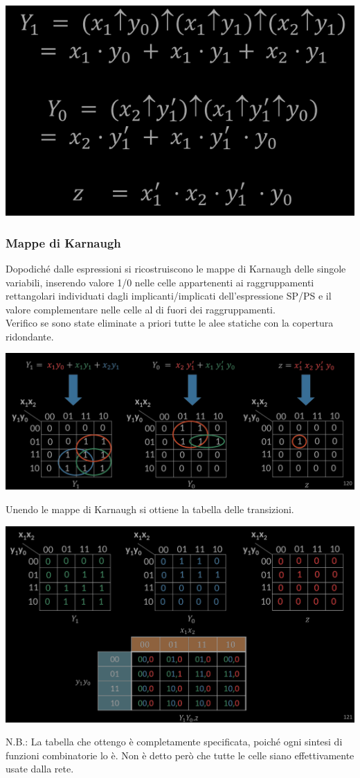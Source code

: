 \documentclass{article}
\begin{document}
\begin{center}
    \includegraphics[scale=0.4]{nand2retroEspr.png}
\end{center}
\subsubsection*{Mappe di Karnaugh}
Dopodiché dalle espressioni si ricostruiscono le mappe di Karnaugh delle singole variabili, inserendo valore 1/0 nelle celle appartenenti ai raggruppamenti rettangolari individuati dagli implicanti/implicati dell’espressione SP/PS e il valore complementare nelle celle al di fuori dei raggruppamenti.\\
Verifico se sono state eliminate a priori tutte le alee statiche con la copertura ridondante.
\begin{center}
    \includegraphics[scale=0.35]{sintesiKarnaugh.png}
\end{center}
Unendo le mappe di Karnaugh si ottiene la tabella delle transizioni.
\begin{center}
    \includegraphics[scale=0.35]{sintesiTransizioni.png}
\end{center}
N.B.: La tabella che ottengo è completamente specificata, poiché ogni sintesi di funzioni combinatorie lo è. Non è detto però che tutte le celle siano effettivamente usate dalla rete.
\end{document}
